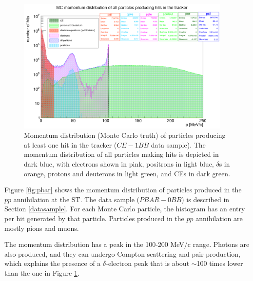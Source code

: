 \begin{figure}[!h]
        \centering
        \includegraphics[width =0.95\textwidth]{figures/png/Screenshot_20240812_152905.png}
    \caption[Monte Carlo momentum distribution 
    of particles producing hits in the Mu2e 
    tracker ($CE-1BB$ data sample).]{
        Momentum distribution (Monte Carlo truth)  
       of particles producing at 
       least one hit in the tracker 
       ($CE-1BB$ data sample).  
       The momentum distribution 
       of all particles making hits is 
       depicted in dark blue, with electrons 
       shown in pink, positrons in light 
       blue, $\delta$s in orange, protons 
       and deuterons in 
       light green, and CEs in dark green. }
       \label{fig:momhits}
\end{figure}


Figure \ref{fig:pbar} shows the momentum distribution of 
particles produced in the $p\bar{p}$ annihilation at the ST. 
The data sample ($PBAR-0BB$) is described in Section \ref{datasample}.
For each Monte Carlo particle, the histogram 
has an entry per hit generated by that particle. 
Particles produced in the $p\bar{p}$ annihilation 
are mostly pions and muons.

The momentum distribution has a 
peak in the 100-200 MeV/c range. Photons are also 
produced, and they can undergo Compton scattering and 
pair production, which explains the presence of a 
$\delta$-electron peak that is about $\sim$100 
times lower than the one in Figure \ref{fig:momhits}.

